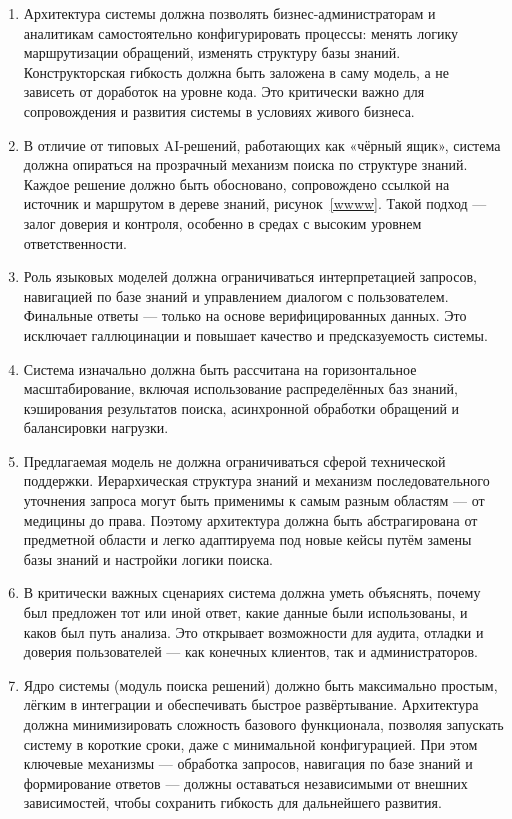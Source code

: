 \begin{enumerate}[label=\arabic*.]
    \item Архитектура системы должна позволять бизнес-администраторам и аналитикам самостоятельно конфигурировать процессы: менять логику маршрутизации обращений, изменять структуру базы знаний. Конструкторская гибкость должна быть заложена в саму модель, а не зависеть от доработок на уровне кода. Это критически важно для сопровождения и развития системы в условиях живого бизнеса.
    \item В отличие от типовых AI-решений, работающих как «чёрный ящик», система должна опираться на прозрачный механизм поиска по структуре знаний. Каждое решение должно быть обосновано, сопровождено ссылкой на источник и маршрутом в дереве знаний, рисунок~\ref{wwww}. Такой подход — залог доверия и контроля, особенно в средах с высоким уровнем ответственности.
    \item Роль языковых моделей должна ограничиваться интерпретацией запросов, навигацией по базе знаний и управлением диалогом с пользователем. Финальные ответы — только на основе верифицированных данных. Это исключает галлюцинации и повышает качество и предсказуемость системы.
    \item Система изначально должна быть рассчитана на горизонтальное масштабирование, включая использование распределённых баз знаний, кэширования результатов поиска, асинхронной обработки обращений и балансировки нагрузки.
    \item Предлагаемая модель не должна ограничиваться сферой технической поддержки. Иерархическая структура знаний и механизм последовательного уточнения запроса могут быть применимы к самым разным областям — от медицины до права. Поэтому архитектура должна быть абстрагирована от предметной области и легко адаптируема под новые кейсы путём замены базы знаний и настройки логики поиска.
    \item В критически важных сценариях система должна уметь объяснять, почему был предложен тот или иной ответ, какие данные были использованы, и каков был путь анализа. Это открывает возможности для аудита, отладки и доверия пользователей — как конечных клиентов, так и администраторов.
    \item Ядро системы (модуль поиска решений) должно быть максимально простым, лёгким в интеграции и обеспечивать быстрое развёртывание. Архитектура должна минимизировать сложность базового функционала, позволяя запускать систему в короткие сроки, даже с минимальной конфигурацией. При этом ключевые механизмы — обработка запросов, навигация по базе знаний и формирование ответов — должны оставаться независимыми от внешних зависимостей, чтобы сохранить гибкость для дальнейшего развития.
\end{enumerate}

